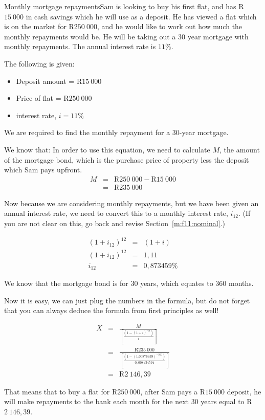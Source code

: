 \begin{wex}{Monthly mortgage repayments}{Sam is looking to buy his first flat, and has R$15~000$ in cash savings which he will use as a deposit. He has viewed a flat which is on the market for R$250~000$, and he would like to work out how much the monthly repayments would be. He will be taking out a 30 year mortgage with monthly repayments. The annual interest rate is $11\%$.}
{
The following is given:
\begin{itemize}
\item{Deposit amount = R$15~000$}
\item{Price of flat = R$250~000$}
\item{interest rate, $i=11\%$}
\end{itemize}
We are required to find the monthly repayment for a 30-year mortgage.

We know that:
In order to use this equation, we need to calculate $M$, the amount of the mortgage bond, which is the purchase price of property less the deposit which Sam pays upfront.
\begin{eqnarray*}
M &=& \mbox{R}250~000 - \mbox{R}15~000\\
&=& \mbox{R}235~000
\end{eqnarray*}

Now because we are considering monthly repayments, but we have been given an annual interest rate, we need to convert this to a monthly interest rate, $i_{12}$. (If you are not clear on this, go back and revise Section~\ref{m:f11:nominal}.)

\begin{eqnarray*}
(1+ i_{12})^{12} &=& (1+i)\\
(1 + i_{12})^{12} &=& 1,11\\
i_{12} &=& 0,873459\%
\end{eqnarray*}

We know that the mortgage bond is for 30 years, which equates to 360 months.

Now it is easy, we can just plug the numbers in the formula, but do not forget that you can always deduce the formula from first principles as well!

\begin{eqnarray*}
X &=& \frac{M}{[\frac{(1-(1+i)^{-n})}{i}]}\\
&=& \frac{\mbox{R}235~000}{[\frac{(1-(1.00876459)^{-360})}{0,008734594}]}\\
&=& \mbox{R}2~146,39
\end{eqnarray*}

That means that to buy a flat for R$250~000$, after Sam pays a R$15~000$ deposit, he will make repayments to the bank each month for the next 30 years equal to R$2~146,39$.}
\end{wex}

